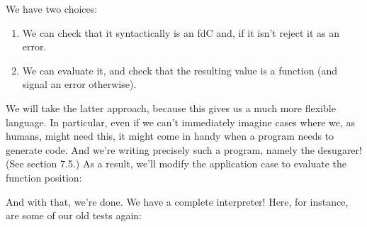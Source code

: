 We have two choices:
\begin{enumerate}[nosep]
  \item 
We can check that it syntactically is an fdC and, if it isn’t reject it as an
error.
  \item 
We can evaluate it, and check that the resulting value is a function (and signal
an error otherwise).
\end{enumerate}
We will take the latter approach, because this gives us a much more flexible
language. In particular, even if we can’t immediately imagine cases where we, as
humans, might need this, it might come in handy when a program needs to generate
code. And we’re writing precisely such a program, namely the desugarer! (See
section 7.5.) As a result, we’ll modify the application case to evaluate the
function position:


And with that, we’re done. We have a complete interpreter! Here, for instance,
are some of our old tests again:
